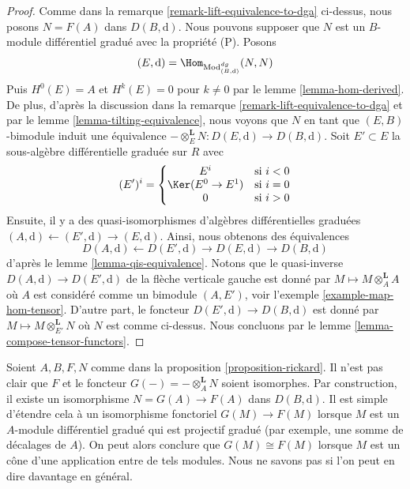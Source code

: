 \begin{proof}
Comme dans la remarque \ref{remark-lift-equivalence-to-dga} ci-dessus, nous posons $N =
F(A)$ dans $D(B, \text{d})$. Nous pouvons supposer que $N$ est un $B$-module
différentiel gradué avec la propriété (P). Posons
$$
(E, \text{d}) = \Hom_{\text{Mod}^{dg}_{(B, \text{d})}}(N, N)
$$
Puis $H^0(E) = A$ et $H^k(E) = 0$ pour $k \not = 0$ par le
lemme \ref{lemma-hom-derived}. De
plus, d'après la discussion dans la remarque \ref{remark-lift-equivalence-to-dga} et
par le lemme \ref{lemma-tilting-equivalence},
nous voyons que $N$ en tant que $(E, B)$-bimodule induit
une équivalence $- \otimes_E^\mathbf{L} N : D(E, \text{d}) \to D(B, \text{d})$. Soit
$E' \subset E$ la sous-algèbre différentielle graduée sur $R$
avec
$$
(E')^i = \left\{
\begin{matrix}
E^i & \text{si }i < 0 \\
\Ker(E^0 \to E^1) & \text{si }i = 0 \\
0 & \text{si }i > 0
\end{matrix}
\right.
$$
Ensuite, il y a des quasi-isomorphismes d'algèbres
différentielles graduées $(A, \text{d}) \leftarrow (E', \text{d}) \rightarrow (E, \text{d})$. Ainsi,
nous obtenons des équivalences
$$
D(A, \text{d}) \leftarrow D(E', \text{d}) \rightarrow D(E, \text{d})
\rightarrow D(B, \text{d})
$$
d'après le lemme
\ref{lemma-qis-equivalence}. Notons que le quasi-inverse $D(A, \text{d}) \to D(E', \text{d})$
de la flèche verticale gauche est
donné par $M \mapsto M \otimes_A^\mathbf{L} A$ où $A$ est considéré comme
un bimodule $(A, E')$, voir l'exemple \ref{example-map-hom-tensor}.
D'autre part, le foncteur $D(E', \text{d}) \to D(B, \text{d})$ est donné par $M
\mapsto M \otimes_{E'}^\mathbf{L} N$ où $N$ est comme ci-dessus. Nous
concluons par le lemme \ref{lemma-compose-tensor-functors}.
\end{proof}

\begin{remark}
\label{remark-rickard}
Soient $A, B, F, N$ comme dans la proposition \ref{proposition-rickard}.
Il n'est pas clair que $F$ et le foncteur
$G(-) = - \otimes_A^\mathbf{L} N$ soient isomorphes. Par
construction, il existe un isomorphisme $N =
G(A) \to F(A)$ dans $D(B, \text{d})$. Il est
simple d'étendre cela à un isomorphisme fonctoriel $G(M) \to F(M)$ lorsque
$M$ est un $A$-module différentiel gradué qui est projectif gradué (par
exemple, une somme de décalages de $A$). On peut alors
conclure que $G(M) \cong F(M)$ lorsque $M$ est un cône d'une application entre
de tels modules. Nous ne savons pas si l'on peut en dire davantage en
général.
\end{remark}

